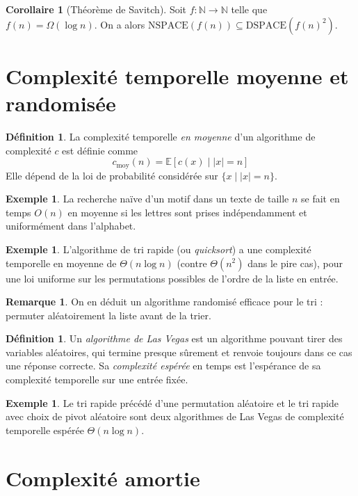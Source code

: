 \documentclass[a5paper, 10pt]{article}
\theoremstyle{definition}
\newtheorem{definition}[equation]{Définition}
\newtheorem{example}[equation]{Exemple}
\newtheorem{remark}[equation]{Remarque}
\newtheorem{corollary}[equation]{Corollaire}
\newcounter{n}
\def\N{\mathbb{N}}
\begin{document}
\begin{corollary}[Théorème de Savitch]
  Soit $f : \N \to \N$ telle que $f(n) = \Omega(\log n)$. On a alors
  $\mathrm{NSPACE}(f(n)) \subseteq \mathrm{DSPACE}(f(n)^2)$.
\end{corollary}

\section{Complexité temporelle moyenne et randomisée}

\begin{definition}
  La complexité temporelle \emph{en moyenne} d'un algorithme de complexité $c$
  est définie comme
  \[c_{\mathrm{moy}}(n) = \mathbb{E}[c(x) \mid |x| = n]\]
  Elle dépend de la loi de probabilité considérée sur $\{x \mid |x| = n\}$.  
\end{definition}
\begin{example}
  La recherche naïve d'un motif dans un texte de taille $n$ se fait en temps
  $O(n)$ en moyenne si les lettres sont prises indépendamment et uniformément
  dans l'alphabet.
\end{example}
\begin{example}
  L'algorithme de tri rapide (ou \emph{quicksort}) a une complexité temporelle
  en moyenne de $\Theta(n \log n)$ (contre $\Theta(n^2)$ dans le pire cas), pour une loi
  uniforme sur les permutations possibles de l'ordre de la liste en entrée.
\end{example}
\begin{remark}
  On en déduit un algorithme randomisé efficace pour le tri : permuter
  aléatoirement la liste avant de la trier.
\end{remark}

\begin{definition}
  Un \emph{algorithme de Las Vegas} est un algorithme pouvant tirer des
  variables aléatoires, qui termine presque sûrement et renvoie toujours dans ce
  cas une réponse correcte. Sa \emph{complexité espérée} en temps est
  l'espérance de sa complexité temporelle sur une entrée fixée.
\end{definition}
\begin{example}
  Le tri rapide précédé d'une permutation aléatoire et le tri rapide avec choix
  de pivot aléatoire sont deux algorithmes de Las Vegas de complexité temporelle
  espérée $\Theta(n \log n)$.
\end{example}

\section{Complexité amortie}
\end{document}
